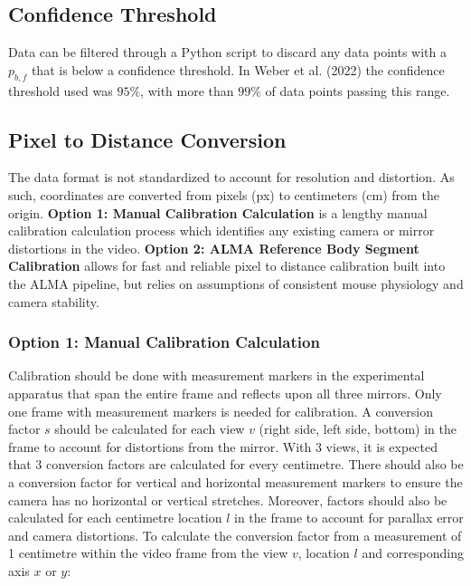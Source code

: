 \documentclass[11pt]{article}
\renewcommand{\[}{%
  \par\smallskip\noindent
  \begin{center}%
  \setlength{\fboxsep}{5pt}%
  \setlength{\fboxrule}{0.35pt}%
  \begin{lrbox}{\almaEquationBox}%
  $\displaystyle
}
\renewcommand{\]}{%
  $%
  \end{lrbox}%
  \fcolorbox{equationLine}{equationBack}{\usebox{\almaEquationBox}}%
  \end{center}%
  \smallskip\par
}
\begin{document}
\subsection{Confidence Threshold}

Data can be filtered through a Python script to discard any data points with a $p_{b, f}$ that is below a confidence threshold. In Weber et al. (2022) the confidence threshold used was $95\%$, with more than $99\%$ of data points passing this range. 

\subsection{Pixel to Distance Conversion}

The data format is not standardized to account for resolution and distortion. As such,
coordinates are converted from pixels (px) to centimeters (cm)
from the origin. \textbf{Option 1: Manual Calibration Calculation} is a lengthy manual calibration calculation process which identifies any existing camera or mirror distortions in the video. \textbf{Option 2: ALMA Reference Body Segment Calibration} allows for fast and reliable pixel to distance calibration built into the ALMA pipeline, but relies on assumptions of consistent mouse physiology and camera stability. 

\subsubsection{Option 1: Manual Calibration Calculation}

Calibration should be done with measurement markers in the experimental apparatus that span the entire frame and reflects upon all three mirrors. Only one frame with measurement markers is needed for calibration. A conversion factor $s$ should be calculated for each view $v$ (right side, left side, bottom) in the frame to account for distortions from the mirror. With 3 views, it is expected that 3 conversion factors are calculated for every centimetre. There should also be a conversion factor for vertical and horizontal measurement markers to ensure the camera has no horizontal or vertical stretches.  Moreover, factors should also be calculated for each centimetre location $l$ in the frame to account for parallax error and camera distortions. To calculate the conversion factor from a measurement of 1 centimetre within the video frame from the view $v$, location $l$ and corresponding axis $x$ or $y$:
\end{document}
